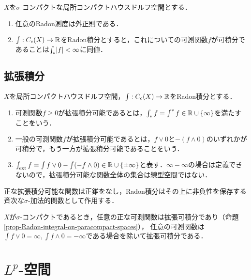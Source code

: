 \documentclass[uplatex,dvipdfmx]{jsreport}
\begin{document}
\begin{proposition}\label{prop-Radon-integral-on-paracompact-spaces}
    $X$を$\sigma$-コンパクトな局所コンパクトハウスドルフ空間とする．
    \begin{enumerate}
        \item 任意のRadon測度は外正則である．
        \item $\int:C_c(X)\to\mathbb{R}$をRadon積分とすると，これについての可測関数$f$が可積分であることは$\int_*\lvert f\rvert<\infty$に同値．
    \end{enumerate}
\end{proposition}

\subsection{拡張積分}

\begin{definition}
    $X$を局所コンパクトハウスドルフ空間，$\int:C_c(X)\to\mathbb{R}$をRadon積分とする．
    \begin{enumerate}
        \item 可測関数$f\ge0$が拡張積分可能であるとは，$\int_*f=\int^*f\in\mathbb{R}\cup\{\infty\}$を満たすことをいう．
        \item 一般の可測関数$f$が拡張積分可能であるとは，$f\lor0$と$-(f\land0)$のいずれかが可積分で，もう一方が拡張積分可能であることをいう．
        \item $\int_{\mathrm{ext}} f=\int f\lor0-\int(-f\land 0)\in\mathbb{R}\cup\{\pm\infty\}$と表す．$\infty-\infty$の場合は定義できないので，拡張積分可能な関数全体の集合は線型空間ではない．
    \end{enumerate}
\end{definition}

\begin{lemma}
    正な拡張積分可能な関数は正錐をなし，Radon積分はその上に非負性を保存する斉次な$\sigma$-加法的関数として作用する．
\end{lemma}

\begin{lemma}
    $X$が$\sigma$-コンパクトであるとき，任意の正な可測関数は拡張可積分であり（命題\ref{prop-Radon-integral-on-paracompact-spaces}），
    任意の可測関数は$\int f\lor0=\infty,\int f\land0=-\infty$である場合を除いて拡張可積分である．
\end{lemma}

\section{$L^p$-空間}
\end{document}
